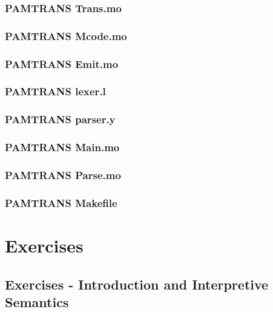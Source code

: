\documentclass[10pt,a4]{article}
\begin{document}
\subsubsection*{PAMTRANS Trans.mo}


\subsubsection*{PAMTRANS Mcode.mo}


\subsubsection*{PAMTRANS Emit.mo}


\lstset{language=}
\subsubsection*{PAMTRANS lexer.l}


\subsubsection*{PAMTRANS parser.y}

\lstset{language=modelica}

\subsubsection*{PAMTRANS Main.mo}


\subsubsection*{PAMTRANS Parse.mo}


\subsubsection*{PAMTRANS Makefile}


\section*{Exercises}

\subsection*{Exercises - Introduction and Interpretive Semantics}
\end{document}
